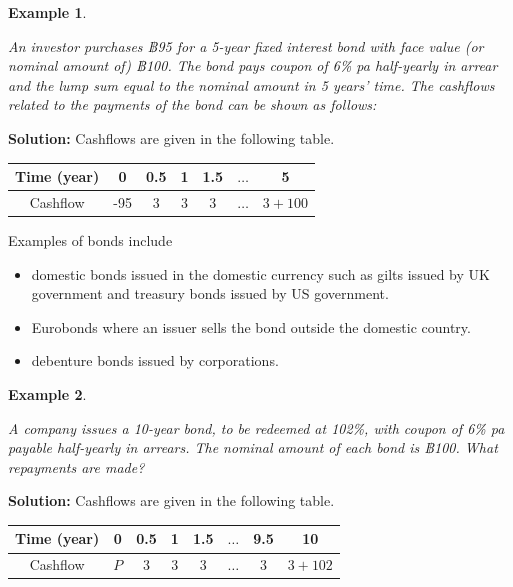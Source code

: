 \documentclass[
]{book}
\theoremstyle{definition}
\theoremstyle{definition}
\newtheorem{example}{Example}[chapter]
\theoremstyle{definition}
\theoremstyle{definition}
\theoremstyle{remark}
\begin{document}
\begin{example}
\protect\hypertarget{exm:unlabeled-div-54}{}\label{exm:unlabeled-div-54}

\emph{An investor purchases ฿95 for a 5-year fixed interest bond with face
value (or nominal amount of) ฿100. The bond pays coupon of 6\% pa
half-yearly in arrear and the lump sum equal to the nominal amount in 5
years' time. The cashflows related to the payments of the bond can be
shown as follows:}

\end{example}

\textbf{Solution:} Cashflows are given in the following table.

\begin{longtable}[]{@{}ccccccc@{}}
\toprule
Time (year) & 0 & 0.5 & 1 & 1.5 & \(\ldots\) & 5 \\
\midrule
\endhead
Cashflow & -95 & 3 & 3 & 3 & \(\ldots\) & \(3 + 100\) \\
\bottomrule
\end{longtable}

Examples of bonds include

\begin{itemize}
\item
  domestic bonds issued in the domestic currency such as gilts issued
  by UK government and treasury bonds issued by US government.
\item
  Eurobonds where an issuer sells the bond outside the domestic
  country.
\item
  debenture bonds issued by corporations.
\end{itemize}

\begin{example}
\protect\hypertarget{exm:exampleBondPrice}{}\label{exm:exampleBondPrice}

\emph{A company issues a 10-year bond, to be redeemed at 102\%, with coupon of
6\% pa payable half-yearly in arrears. The nominal amount of each bond is
฿100. What repayments are made?}

\end{example}

\textbf{Solution:} Cashflows are given in the following table.

\begin{longtable}[]{@{}cccccccc@{}}
\toprule
Time (year) & 0 & 0.5 & 1 & 1.5 & \(\ldots\) & 9.5 & 10 \\
\midrule
\endhead
Cashflow & \(P\) & 3 & 3 & 3 & \(\ldots\) & \(3\) & \(3 + 102\) \\
\bottomrule
\end{longtable}
\end{document}
